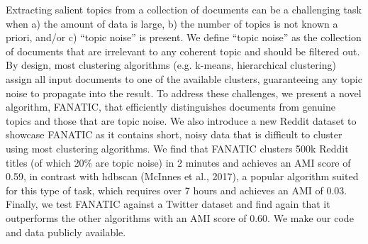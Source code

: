 Extracting salient topics from a collection of documents can be a challenging task when a) the amount of data is large, b) the number of topics is not known a priori, and/or c) ``topic noise'' is present. We define ``topic noise'' as the collection of documents that are irrelevant to any coherent topic and should be filtered out. By design, most clustering algorithms (e.g. k-means, hierarchical clustering) assign all input documents to one of the available clusters, guaranteeing any topic noise to propagate into the result. To address these challenges, we present a novel algorithm, {FANATIC}, that efficiently distinguishes documents from genuine topics and those that are topic noise. We also introduce a new {R}eddit dataset to showcase {FANATIC} as it contains short, noisy data that is difficult to cluster using most clustering algorithms. We find that {FANATIC} clusters 500k {R}eddit titles (of which 20\% are topic noise) in 2 minutes and achieves an {AMI} score of 0.59, in contrast with hdbscan (McInnes et al., 2017), a popular algorithm suited for this type of task, which requires over 7 hours and achieves an {AMI} of 0.03. Finally, we test {FANATIC} against a {T}witter dataset and find again that it outperforms the other algorithms with an {AMI} score of 0.60. We make our code and data publicly available.
